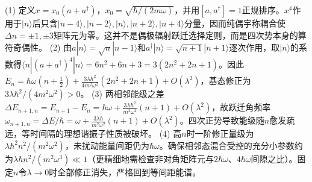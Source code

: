 (1) 定义\(x=x_0(a+a^\dagger)\)，\(x_0=\sqrt{\hbar/(2m\omega)}\)，并用\([a,a^\dagger]=1\)正规排序。\(x^4\)作用于\(|n\rangle\)后只含\(|n-4\rangle,|n-2\rangle,|n\rangle,|n+2\rangle,|n+4\rangle\)分量，因而纯偶宇称耦合使\(\Delta n=\pm1,\pm3\)矩阵元为零。这并不是偶极辐射跃迁选择定则，而是四次势本身的算符奇偶性。
(2) 由\(a|n\rangle=\sqrt n|n-1\rangle\)和\(a^\dagger|n\rangle=\sqrt{n+1}|n+1\rangle\)逐次作用，取\(|n\rangle\)的系数得\(\langle n|(a+a^\dagger)^4|n\rangle=6n^2+6n+3=3(2n^2+2n+1)\)。因此\(E_n=\hbar\omega(n+\tfrac12)+\frac{3\lambda\hbar^2}{4m^2\omega^2}(2n^2+2n+1)+O(\lambda^2)\)，基态修正为\(3\lambda\hbar^2/(4m^2\omega^2)>0\)。
(3) 两相邻能级之差\(\Delta E_{n+1,n}=E_{n+1}-E_n=\hbar\omega+\frac{3\lambda\hbar^2}{m^2\omega^2}(n+1)+O(\lambda^2)\)，故跃迁角频率\(\omega_{n+1,n}=\Delta E/\hbar=\omega+\frac{3\lambda\hbar}{m^2\omega^2}(n+1)+O(\lambda^2)\)。四次正势导致能级随\(n\)愈发疏远，等时间隔的理想谐振子性质被破坏。
(4) 高\(n\)时一阶修正量级为\(\lambda\hbar^2 n^2/(m^2\omega^2)\)，未扰动能量间距仍为\(\hbar\omega\)。确保相邻态混合受控的充分小参数约为\(\lambda\hbar n^2/(m^2\omega^3)\ll1\)（更精细地需检查非对角矩阵元与\(2\hbar\omega\)、\(4\hbar\omega\)间隙之比）。固定\(n\)令\(\lambda\to0\)时全部修正消失，严格回到等间距能谱。
